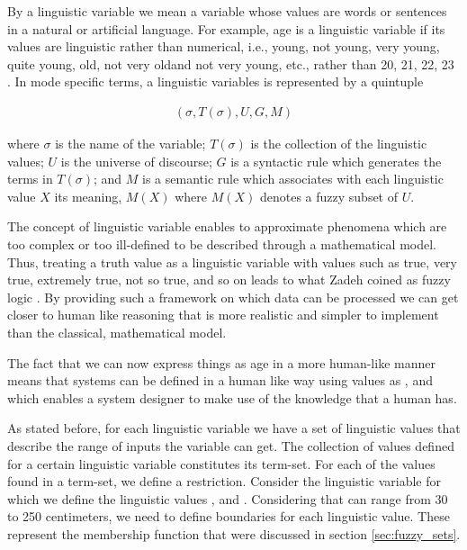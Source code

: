 \qquad By a linguistic variable we mean a variable whose values are words or sentences in a natural or artificial
language. For example, age is a linguistic variable if its values are linguistic rather than numerical, i.e.,
young, not young, very young, quite young, old, not very oldand not very young, etc., rather than 20, 21, 22,
23 \cite{ling_vars_zadeh}. In mode specific terms, a linguistic variables is represented by a quintuple

\begin{align}
(\sigma, T(\sigma), U, G, M)
\end{align}

where $\sigma$ is the name of the variable; $T(\sigma)$ is the collection of the
linguistic values; $U$ is the universe of discourse; $G$ is a syntactic rule which generates the terms in
$T(\sigma)$; and $M$ is a semantic rule which associates with each linguistic value $X$ its meaning, $M(X)$
where $M(X)$ denotes a fuzzy subset of $U$.

\qquad The concept of linguistic variable enables to approximate phenomena which are too complex or too ill-defined
to be described through a mathematical model. Thus, treating a truth value as a linguistic variable with
values such as true, very true, extremely true, not so true, and so on leads to what Zadeh coined as fuzzy
logic \cite{ling_vars_zadeh}.
By providing such a framework on which data can be processed we can get closer to human like reasoning that
is more realistic and simpler to implement than the classical, mathematical model.

\qquad The fact that we can now express things as age in a more human-like manner means that systems can be
defined in a human like way using values as ,  and  which
enables a system designer to make use of the knowledge that a human has.

\qquad As stated before, for each linguistic variable we have a set of linguistic values that describe
the range of inputs the variable can get. The collection of values defined for a certain linguistic variable
constitutes its term-set. For each of the values found in a term-set, we define a restriction.
Consider the linguistic variable  for which we define the linguistic values ,
 and . Considering that  can range from 30 to 250 centimeters,
we need to define boundaries for each linguistic value. These represent the membership function that were
discussed in section \ref{sec:fuzzy_sets}.

